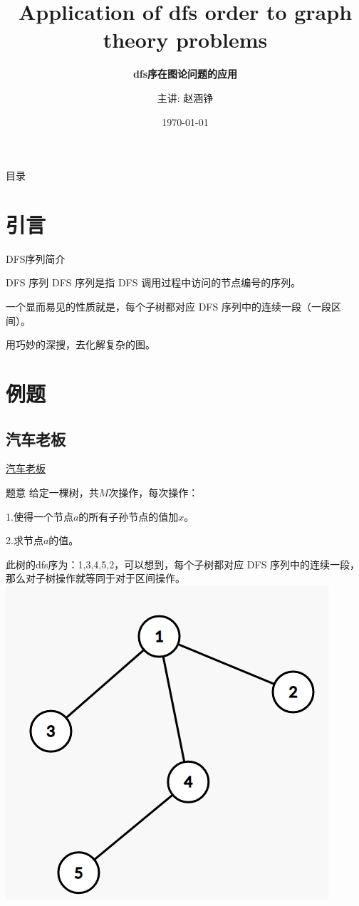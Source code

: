 \documentclass[10pt,aspectratio=43,mathserif,table]{beamer}
\title{Application of dfs order to graph theory problems}
\subtitle{\fontsize{9pt}{14pt}\textbf{dfs序在图论问题的应用}}
\author{主讲: 赵涵铮}
\institute{agile studio}
\date{\today}
\begin{document}
	
	\frame{\titlepage}
	
	\section[目录]{}   %
	\begin{frame}{目录}
		\tableofcontents
	\end{frame}
	
	\section{引言}  %
	\begin{frame}{DFS序列简介}
		\begin{block}{DFS 序列}
			DFS 序列是指 DFS 调用过程中访问的节点编号的序列。
			
			一个显而易见的性质就是，每个子树都对应 DFS 序列中的连续一段（一段区间）。
		\end{block}
		用巧妙的深搜，去化解复杂的图。
	\end{frame}
	
	\section{例题}
	\subsection{汽车老板}
	\begin{frame}{\href{https://www.mfstem.org/p/1559}{汽车老板}}
		
		\begin{block}{题意}
			给定一棵树，共$M$次操作，每次操作：
			
			1.使得一个节点$a$的所有子孙节点的值加$x$。
			
			2.求节点$a$的值。
		\end{block}
	\end{frame}
	
	\begin{frame}
		此树的dfs序为：1,3,4,5,2，可以想到，每个子树都对应 DFS 序列中的连续一段，那么对子树操作就等同于对于区间操作。
		\includegraphics[width = 0.65\linewidth]{./figure/tree}		
	\end{frame}
	
\end{document}
